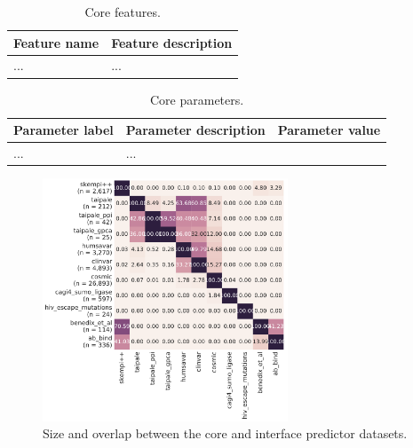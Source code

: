 \clearpage


\begin{table}[ht]
\caption{Core features.} \label{tab:core_features}
\begin{tabular}{l | p{13cm}}
	\toprule
	Feature name & Feature description \\
	\midrule
	... & ... \\
	\bottomrule
\end{tabular}
\end{table}


\begin{table}[ht]
\caption{Core parameters.} \label{tab:core_parameters}
\begin{tabular}{l | l | l}
	\toprule
	Parameter label & Parameter description & Parameter value \\
	\midrule
	... & ... \\
	\bottomrule
\end{tabular}
\end{table}




\begin{figure}[ht]
	\centering
	\includegraphics[width=0.65\textwidth]{static/elaspic_training_set/data_statistics/training_set_overlap_data_df_interface.pdf}
	\caption{Size and overlap between the core and interface predictor datasets.}
\end{figure}

